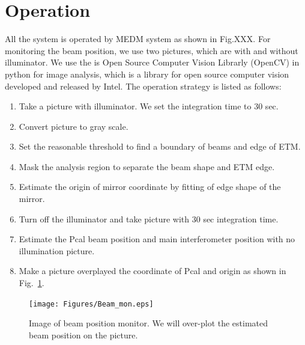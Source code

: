 \section{Operation}
All the system is operated by MEDM system as shown in Fig.XXX.
For monitoring the beam position, we use two pictures, which are with and without illuminator. We use the is Open Source Computer Vision Librarly (OpenCV) in python for image analysis, which is a library for open source computer vision developed and released by Intel.
The operation strategy is listed as follows:
\begin{enumerate}
 \item Take a picture with illuminator. We set the integration time to 30 sec.
  \item Convert picture to gray scale.
  \item Set the reasonable threshold to find a boundary of beams and edge of ETM. 
   \item Mask the analysis region to separate the beam shape and ETM edge.
 \item Estimate the origin of mirror coordinate by fitting of edge shape of the mirror.
 \item Turn off the illuminator and take picture with 30 sec integration time.
  \item Estimate the Pcal beam position and main interferometer position with no illumination picture.
   \item Make a picture overplayed the coordinate of Pcal and origin as shown in Fig.~\ref{fig:Beam_mon}.
   \end{enumerate}
   \begin{figure}
\begin{center}
\texttt{[image: Figures/Beam\_mon.eps]}
\caption{Image of beam position monitor. We will over-plot the estimated beam position on the picture.} 
\label{fig:Beam_mon} 
\end{center}
\end{figure}


